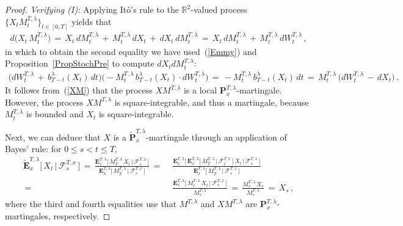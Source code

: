 \documentclass[10pt]{article}
\numberwithin{equation}{section}
\theoremstyle{definition}
\newcommand{\R}{{\mathbb R}}
\begin{document}
\begin{proof}
\noindent \textit{Verifying (I):} Applying It\^o's rule to the $\R^2$-valued process $\{X_t M_{t}^{T,\lambda} \}_{t\in [0,T]}$ yields that 
 \begin{align}\label{XM}
     d\big( X_t \,M_{t}^{T,\lambda}\big)\,=\, X_t \,d M_{t}^{T,\lambda}\,+\,  M_{t}^{T,\lambda} \,d X_t\,+\,  dX_t \,dM_{t}^{T,\lambda} \,=\, X_t\, d M_{t}^{T,\lambda}\,+\,  M_{t}^{T,\lambda}\,dW_{t}^{T,\lambda}\,,
  \end{align}
in which to obtain the second equality we have  used~(\ref{Emmy}) and  Proposition~\ref{PropStochPre} to compute  $dX_t  dM_{t}^{T,\lambda}$:
\begin{align*}
\Big( dW_{t}^{T,\lambda}\,+ \, b_{T-t}^{\lambda}(X_t)   \,dt  \Big)\Big( -M_{t}^{T,\lambda}\, b_{T-t}^{\lambda}(X_t) \cdot dW_{t}^{T,\lambda} \Big)  \,=\, -M_{t}^{T,\lambda}\, b_{T-t}^{\lambda}(X_t) \, dt
 \,=\, M_{t}^{T,\lambda}\,\big( dW_{t}^{T,\lambda}\,-\,dX_t   \big)\,.
\end{align*}
It follows from~(\ref{XM}) that the process $XM^{T,\lambda}$ is a local $\mathbf{P}_{x }^{T,\lambda }$-martingale.  However, the process $XM^{T,\lambda}$ is square-integrable, and thus a martingale, because $M^{T,\lambda}_t$ is bounded and    $X_t$ is square-integrable.

Next, we can  deduce that $X$ is a    $\mathbf{\widetilde{P}}_{x }^{T,\lambda}$-martingale through an application of Bayes' rule: for  $0\leq s<t\leq T$,
 \begin{align}\label{Bayes}
 \mathbf{\widetilde{E}}_{x }^{T,\lambda}\big[\, X_t \,\big|\,\mathscr{F}_s^{T,x}\,\big]\,=\, \frac{\mathbf{E}_{x }^{T,\lambda}\Big[ \,M_{T}^{T,\lambda} \, X_t \,\Big|\,\mathscr{F}_s^{T,x}\,\Big] }{ \mathbf{E}_{x }^{T,\lambda}\Big[\, M_{T}^{T,\lambda}  \,\Big|\,\mathscr{F}_s^{T,x}\,\Big]  }\nonumber  \,=\,&\, \frac{\mathbf{E}_{x  }^{T,\lambda}\Big[ \,\mathbf{E}_x^{T,\lambda }\Big[\,M_{T}^{T,\lambda}\,\Big|\,\mathscr{F}_t^{T,x}\,\Big] \, X_t \,\Big|\,\mathscr{F}_s^{T,x}\,\Big] }{ \mathbf{E}_{x }^{T,\lambda}\Big[\, M_{T}^{T,\lambda}  \,\Big|\,\mathscr{F}_s^{T,x}\,\Big]  }\nonumber \\ \,=\,&\, \frac{\mathbf{E}_{x }^{T,\lambda }\Big[\, M_{t}^{T,\lambda} \, X_t \,\Big|\,\mathscr{F}_s^{T,x}\,\Big] }{  M_{s}^{T,\lambda}   }\,=\, \frac{M_{s}^{T,\lambda}\, X_s  }{  M_{s}^{T,\lambda}   }\,=\,X_s\, ,  
 \end{align}
 where the  third and fourth equalities  use that $M^{T,\lambda} $ and $XM^{T,\lambda} $ are  $\mathbf{P}_{x }^{T,\lambda}$-martingales, respectively.\vspace{.3cm}
 

\end{proof}
\end{document}
